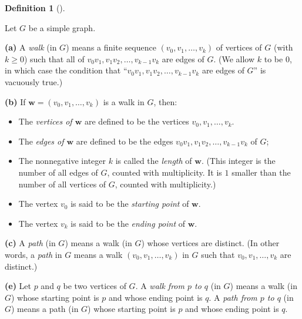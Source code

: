 \documentclass[numbers=enddot,12pt,final,onecolumn,notitlepage]{scrartcl}%
\theoremstyle{definition}
\newtheorem{defi}[theo]{Definition}
\newenvironment{definition}[1][]
{\begin{defi}[#1]\begin{leftbar}}
{\end{leftbar}\end{defi}}
\newcommand{\tup}[1]{\left( #1 \right)}
\begin{document}
\begin{definition} \label{def.intro.walks}
Let $G$ be a simple graph.

\textbf{(a)} A \textit{walk} (in $G$) means a finite sequence
$\tup{v_0, v_1, \ldots, v_k}$ of vertices of $G$ (with $k \geq 0$)
such that all of
$v_0 v_1, v_1 v_2, \ldots, v_{k-1} v_k$ are edges of $G$. (We allow
$k$ to be $0$, in which case the condition that
``$v_0 v_1, v_1 v_2, \ldots, v_{k-1} v_k$ are edges of $G$'' is
vacuously true.)

\textbf{(b)} If $\mathbf{w} = \tup{v_0, v_1, \ldots, v_k}$ is a walk
in $G$, then:

\begin{itemize}
\item The \textit{vertices of $\mathbf{w}$} are defined to be
the vertices $v_0, v_1, \ldots, v_k$.
\item The
\textit{edges of $\mathbf{w}$} are defined to be the edges
$v_0 v_1, v_1 v_2, \ldots, v_{k-1} v_k$ of $G$;
\item The nonnegative integer $k$ is called the
\textit{length} of $\mathbf{w}$. (This integer is the number of all
edges of $G$, counted with multiplicity. It is $1$ smaller than the
number of all vertices of $G$, counted with multiplicity.)
\item The vertex $v_0$ is said to be the \textit{starting point} of
$\mathbf{w}$.
\item The vertex $v_k$ is said to be the \textit{ending point} of
$\mathbf{w}$.
\end{itemize}

\textbf{(c)} A \textit{path} (in $G$) means a walk (in $G$) whose
vertices are distinct. (In other words, a \textit{path} in $G$ means
a walk $\tup{v_0, v_1, \ldots, v_k}$ in $G$ such that
$v_0, v_1, \ldots, v_k$ are distinct.)

\textbf{(e)} Let $p$ and $q$ be two vertices of $G$. A
\textit{walk from $p$ to $q$} (in $G$) means a walk (in $G$) whose
starting point is $p$ and whose ending point is $q$. A
\textit{path from $p$ to $q$} (in $G$) means a path (in $G$) whose
starting point is $p$ and whose ending point is $q$.
\end{definition}
\end{document}
